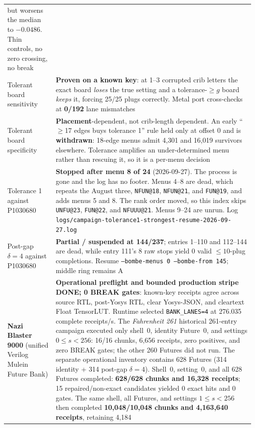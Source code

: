 \documentclass[11pt,a4paper]{article}
\begin{document}
{\begin{longtable}{@{}p{}p{}@{}}
  but worsens the median to $-0.0486$. Thin controls, no zero crossing, no break \\
Tolerant board sensitivity & \textbf{Proven on a known key}: at 1--3 corrupted crib letters the
  exact board \emph{loses} the true setting and a tolerance-$\ge g$ board \emph{keeps} it,
  forcing 25/25 plugs correctly. Metal port cross-checks at \textbf{0/192} lane mismatches \\
Tolerant board specificity & \textbf{Placement}-dependent, not crib-length dependent. An early
  ``$\ge$17 edges buys tolerance 1'' rule held only at offset 0 and is \textbf{withdrawn}:
  18-edge menus admit 4{,}301 and 16{,}019 survivors elsewhere. Tolerance amplifies an
  under-determined menu rather than rescuing it, so it is a per-menu decision \\
Tolerance 1 against P1030680 & \textbf{Stopped after menu 8 of 24} (2026-09-27).
  The process is gone and the log has no footer. Menus 4--8 are dead, which
  repeats the August three, \texttt{NFUN@18}, \texttt{NFUN@21}, and
  \texttt{FUN@19}, and adds menus 5 and 8. The rank order moved, so this index
  skips \texttt{UNFU@23}, \texttt{FUN@22}, and \texttt{NFUUU@21}. Menus 9--24
  are unrun. Log
  \texttt{logs/campaign-tolerance1-strongest-resume-2026-09-27.log} \\
Post-gap $\delta=4$ against P1030680 & \textbf{Partial / suspended at 144/237}; entries 1--110
  and 112--144 are dead, while entry 111's 8 raw stops yield 0 valid $\le10$-plug
  completions. Resume \texttt{--bombe-menus 0 --bombe-from 145}; middle ring remains A \\
\textbf{Nazi Blaster 9000} (unified Verilog Mulein Future Bank) &
  \textbf{Operational preflight and bounded production stripe DONE; 0 BREAK
  gates}: known-key receipts agree across source RTL, post-Yosys RTL, clear
  Yosys-JSON, and cleartext Float TensorLUT. Runtime selected
  \texttt{BANK\_LANES=4} at 276.035 complete receipts/s. The \emph{Fahrenheit 261}
  historical 261-entry campaign executed only shell~0, identity Future~0, and
  settings $0\le s<256$: 16/16 chunks, 6{,}656 receipts, zero positives, and zero
  BREAK gates; the other 260 Futures did not run. The separate operational inventory
  contains 628 Futures (314 identity + 314 post-gap $\delta=4$). Shell~0,
  setting~0, and all 628 Futures completed: \textbf{628/628 chunks and 16{,}328
  receipts}; 15 repaired/non-exact candidates yielded 0 exact hits and 0 gates.
  The same shell, all Futures, and settings $1\le s<256$ then completed
  \textbf{10{,}048/10{,}048 chunks and 4{,}163{,}640 receipts}, retaining 4{,}184

\end{longtable}}
\end{document}
